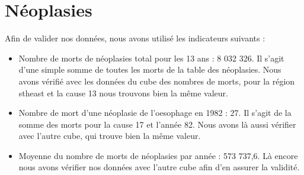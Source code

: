 \section{Néoplasies}
Afin de valider nos données, nous avons utilisé les indicateurs suivants :
\begin{itemize}
    \item Nombre de morts de néoplasies total pour les 13 ans : 8 032 326. Il s'agit d'une simple somme de toutes les morts de la table des néoplasies. Nous avons vérifié avec les données du cube des nombres de morts, pour la région stheast et la cause 13 nous trouvons bien la même valeur.
    \item Nombre de mort d'une néoplasie de l'oesophage en 1982 : 27. Il s'agit de la somme des morts pour la cause 17 et l'année 82. Nous avons là aussi vérifier avec l'autre cube, qui trouve bien la même valeur.
    \item Moyenne du nombre de morts de néoplasies par année : 573 737,6. Là encore nous avons vérifier nos données avec l'autre cube afin d'en assurer la validité.
\end{itemize}



\pagebreak
